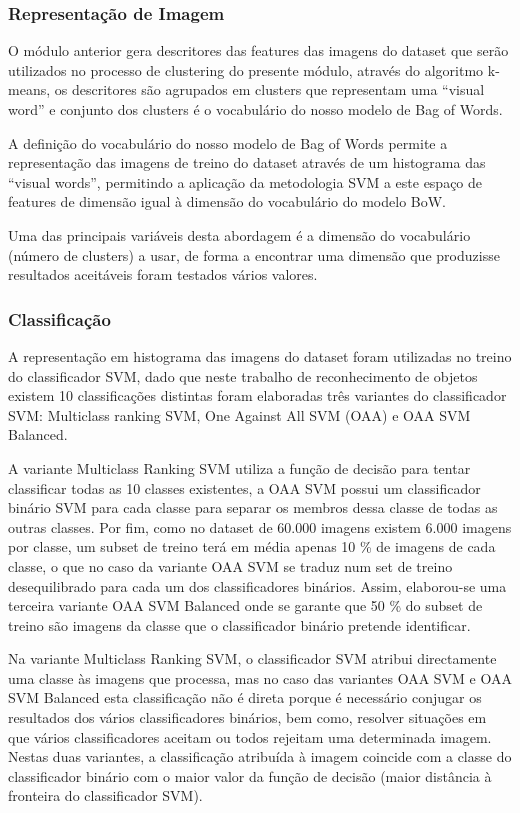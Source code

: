 \documentclass[extendedabs]{vcom}
\begin{document}
\subsubsection{Representação de Imagem}
O módulo anterior gera descritores das features das imagens do dataset que serão utilizados no processo de clustering do presente módulo, através do algoritmo k-means, os descritores são agrupados em clusters que representam uma “visual word” e conjunto dos clusters é o vocabulário do nosso modelo de Bag of Words.

A definição do vocabulário do nosso modelo de Bag of Words permite a representação das imagens de treino do dataset através de um histograma das “visual words”, permitindo a aplicação da metodologia SVM a este espaço de features de dimensão igual à dimensão do vocabulário do modelo BoW.

Uma das principais variáveis desta abordagem é a dimensão do vocabulário (número de clusters) a usar, de forma a encontrar uma dimensão que produzisse resultados aceitáveis foram testados vários valores. 

\subsubsection{Classificação}
A representação em histograma das imagens do dataset foram utilizadas no treino do classificador SVM, dado que neste trabalho de reconhecimento de objetos existem 10 classificações distintas foram elaboradas três variantes do classificador SVM: Multiclass ranking SVM, One Against All SVM (OAA) e OAA SVM Balanced. 

A variante Multiclass Ranking SVM utiliza a função de decisão para tentar classificar todas as 10 classes existentes, a OAA SVM possui um classificador binário SVM para cada classe para separar os membros dessa classe de todas as outras classes. Por fim, como no dataset de 60.000 imagens existem 6.000 imagens por classe, um subset de treino terá em média apenas 10 \% de imagens de cada classe, o que no caso da variante OAA SVM se traduz num set de treino desequilibrado para cada um dos classificadores binários. Assim, elaborou-se uma terceira variante OAA SVM Balanced onde se garante que 50 \% do subset de treino são imagens da classe que o classificador binário pretende identificar.

Na variante Multiclass Ranking SVM, o classificador SVM atribui directamente uma classe às imagens que processa, mas no caso das variantes OAA SVM e OAA SVM Balanced esta classificação não é direta porque é necessário conjugar os resultados dos vários classificadores binários, bem como, resolver situações em que vários classificadores aceitam ou todos rejeitam uma determinada imagem. Nestas duas variantes, a classificação atribuída à imagem coincide com a classe do classificador binário com o maior valor da função de decisão (maior distância à fronteira do classificador SVM).
\end{document}
